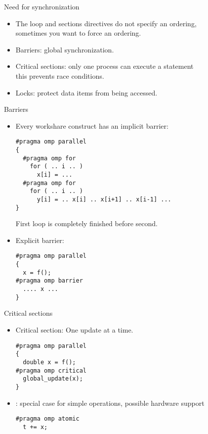 
\begin{frame}[containsverbatim]{Need for synchronization}
  \begin{itemize}
  \item The loop and sections directives do not specify an ordering,\\
    sometimes you want to force an ordering.
  \item Barriers: global synchronization.
  \item Critical sections: only one process can execute a statement\\
    this prevents race conditions.
  \item Locks: protect data items from being accessed.
  \end{itemize}
\end{frame}

\begin{frame}[containsverbatim]{Barriers}
\small
  \begin{itemize}
  \item Every workshare construct has an implicit barrier:
\begin{verbatim}
#pragma omp parallel
{
  #pragma omp for
    for ( .. i .. )
      x[i] = ...
  #pragma omp for
    for ( .. i .. )
      y[i] = .. x[i] .. x[i+1] .. x[i-1] ...
}
\end{verbatim}
First loop is completely finished before second.
\item Explicit barrier:
\begin{verbatim}
#pragma omp parallel
{
  x = f();
#pragma omp barrier
  .... x ...
}
\end{verbatim}
  \end{itemize}
\end{frame}

\begin{frame}[containsverbatim]{Critical sections}
\begin{itemize}
  \item Critical section: One update at a time.
\begin{verbatim}
#pragma omp parallel
{
  double x = f();
#pragma omp critical
  global_update(x);
}
\end{verbatim}
\item {} : special case for simple operations, possible
  hardware support
\begin{verbatim}
#pragma omp atomic
  t += x;
\end{verbatim}
\end{itemize}
\end{frame}

